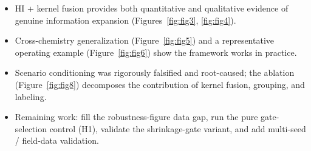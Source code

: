\documentclass[preprint,12pt]{elsarticle}
\begin{document}
\begin{itemize}
  \item HI + kernel fusion provides both quantitative and qualitative evidence of genuine information expansion (Figures~\ref{fig:fig3}, \ref{fig:fig4}).
  \item Cross-chemistry generalization (Figure~\ref{fig:fig5}) and a representative operating example (Figure~\ref{fig:fig6}) show the framework works in practice.
  \item Scenario conditioning was rigorously falsified and root-caused; the ablation (Figure~\ref{fig:fig8}) decomposes the contribution of kernel fusion, grouping, and labeling.
  \item Remaining work: fill the robustness-figure data gap, run the pure gate-selection control (H1), validate the shrinkage-gate variant, and add multi-seed / field-data validation.
\end{itemize}

\end{document}
